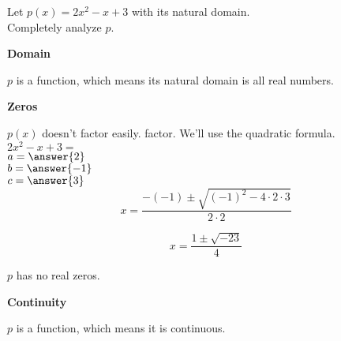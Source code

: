 \documentclass{ximera}
\author{Lee Wayand}
\begin{document}
\begin{exercise} 




Let $p(x) = 2x^2 - x + 3$ with its natural domain. \\


Completely analyze $p$. \\


\begin{question}  \textbf{\textcolor{blue!55!black}{Domain}}


$p$ is a  function, which means its natural domain is all real numbers.

\end{question}








\begin{question}  \textbf{\textcolor{blue!55!black}{Zeros}}


$p(x)$ doesn't factor easily. factor.  We'll use the quadratic formula.\\

$2x^2 - x + 3 = $ \\


$a = \answer{2}$ \\

$b = \answer{-1}$ \\

$c = \answer{3}$ \\


\[
x = \frac{-(-1) \pm \sqrt{(-1)^2 - 4 \cdot 2 \cdot 3}}{2 \cdot 2}
\]


\[
x = \frac{1 \pm \sqrt{-23}}{4}
\]




$p$ has no real zeros.


\end{question}







\begin{question}  \textbf{\textcolor{blue!55!black}{Continuity}}


$p$ is a  function, which means it is continuous.

\end{question}










\end{exercise}
\end{document}
